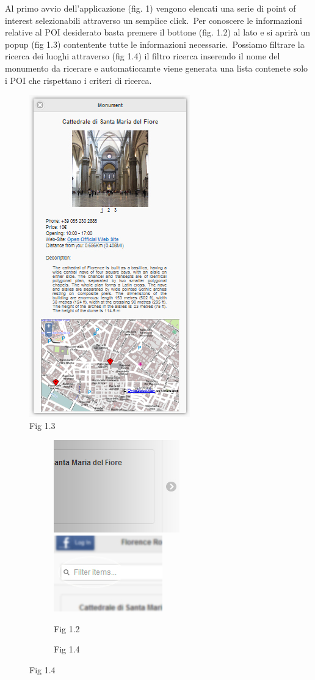Al primo avvio dell'applicazione (fig. 1) vengono elencati una serie di point of interest selezionabili attraverso un semplice click.\
Per conoscere le informazioni relative al POI desiderato basta premere il bottone (fig. 1.2)  al lato e si aprirà un popup (fig 1.3) contentente tutte le informazioni necessarie.\
Possiamo filtrare la ricerca dei luoghi attraverso (fig 1.4) il filtro ricerca inserendo il nome del monumento da ricerare e automaticcamte viene generata una lista contenete solo i POI che rispettano i criteri di ricerca.

\newpage
\begin{figure}
 \center
\includegraphics[width=.4\linewidth]{img/fig1-3}

  \caption{Fig 1.3}
  \label{fig:sub1}

\end{figure}
\begin{figure}
 \center
\begin{subfigure}{.5\textwidth}
  \centering
  \includegraphics[width=.4\linewidth]{img/fig1-2}
\includegraphics[width=.4\linewidth]{img/fig1-4}
  \caption{Fig 1.2}
  \label{fig:sub1}
\end{subfigure}
       \begin{subfigure}{.5\textwidth}
  \centering
  
  \caption{Fig 1.4}
  \label{fig:sub1}
\end{subfigure}
\end{figure}


